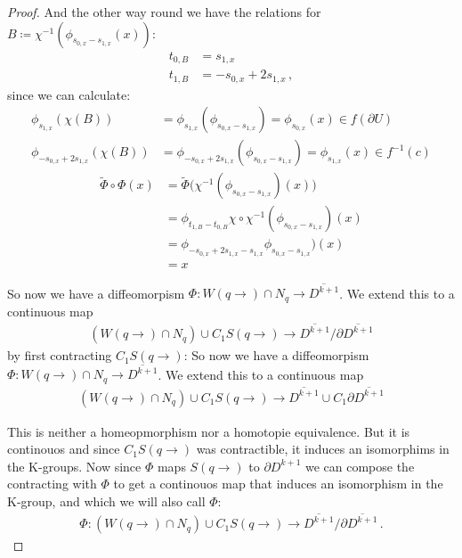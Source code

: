 \begin{proof}
And the other way round we have the relations for $B\coloneq \chi^{-1}(\phi_{s_{0,x}-s_{1,x}}(x))$:
\begin{align*}
	t_{0,B}&=	s_{1,x}\\
	t_{1,B}&=	-s_{0,x}+2s_{1,x}\, , 
\end{align*}
since we can calculate:
\begin{align*}
	\phi_{s_{1,x}}(\chi(B))			  &= \phi_{s_{1,x}}(\phi_{s_{0,x}-s_{1,x}})=\phi_{s_{0,x}}(x)\in f(\partial U)\\
	\phi_{-s_{0,x}+2s_{1,x}}(\chi(B)) &= \phi_{-s_{0,x}+2s_{1,x}}(\phi_{s_{0,x}-s_{1,x}})= \phi_{s_{1,x}}(x) \in f^{-1}(c)
\end{align*}
\begin{align*}
	\tilde{\Phi}\circ \Phi(x)
	&=	\tilde{\Phi} \big( \chi^{-1}(\phi_{s_{0,x}-s_{1,x}})(x) \big)  \\
	&=	\phi_{t_{1,B}-t_{0,B}}\chi \circ \chi^{-1}(\phi_{s_{0,x}-s_{1,x}})(x) \\
	&=  \phi_{	-s_{0,x}+2s_{1,x}-s_{1,x}}\phi_{s_{0,x}-s_{1,x}})(x) \\
	&=  x
\end{align*}

So now we have a diffeomorpism $\Phi:W(q\to)\cap N_q\to \overline{D^{k+1}}$. We extend this to a continuous map 
\begin{align*}
	(W(q\to)\cap N_q)\cup C_1S(q\to) \to \overline{D^{k+1}}\slash \partial \overline{D^{k+1}}
\end{align*} by first contracting $C_1S(q\to)$:
So now we have a diffeomorpism $\Phi:W(q\to)\cap N_q\to \overline{D^{k+1}}$. We extend this to a continuous map
\begin{align*}
	(W(q\to)\cap N_q)\cup C_1S(q\to) \to \overline{D^{k+1}} \cup C_1 \partial \overline{D^{k+1}}
\end{align*} 












This is neither a homeopmorphism nor a homotopie equivalence. But it is continouos and since $C_1S(q\to)$ was contractible, it induces an isomorphims in the K-groups. Now since $\Phi$ maps $S(q\to)$ to $\partial D^{k+1}$ we can compose the contracting with $\Phi$ to get a continouos map that induces an isomorphism in the K-group, and which we will also call $\Phi$:
\begin{align*}
	\Phi: (W(q\to)\cap N_q)\cup C_1S(q\to) \to \overline{D^{k+1}}\slash \partial \overline{D^{k+1}} \,. 
\end{align*}


\end{proof}
